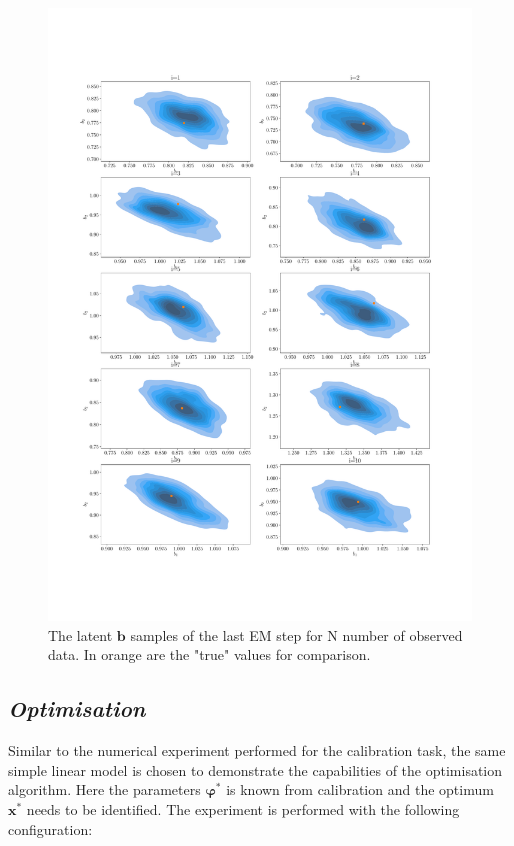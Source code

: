 \documentclass[a4paper,11pt]{article}
\begin{document}
\begin{figure}[!htpb]
    \centering
    \includegraphics[width=\textwidth]{fig/q_N_Emsteps_01_07_2022.pdf}
    \caption{The latent $\bm b$ samples of the last EM step for N number of observed data. In orange are the "true" values for comparison.}
    \label{fig:q_N_EM}
\end{figure}

\subsection{\emph{Optimisation}}\label{opt_section}

Similar to the numerical experiment performed for the calibration task, the same simple linear model is chosen to demonstrate the capabilities of the optimisation algorithm. Here the parameters $\bm \varphi^*$ is known from calibration and the optimum $\bm x^*$ needs to be identified. The experiment is performed with the following configuration:
\end{document}
